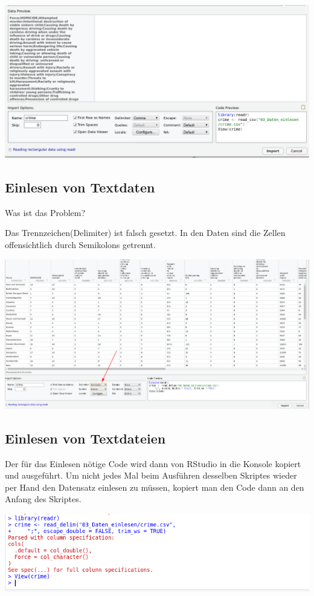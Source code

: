 \documentclass[
]{book}
\begin{document}
\begin{center}\includegraphics[width=0.8\linewidth]{imgs/text} \end{center}

\hypertarget{einlesen-von-textdaten-1}{%
\subsection{Einlesen von Textdaten}\label{einlesen-von-textdaten-1}}

Was ist das Problem?

Das Trennzeichen(Delimiter) ist falsch gesetzt. In den Daten sind die Zellen offensichtlich durch Semikolons getrennt.

\begin{center}\includegraphics[width=0.8\linewidth]{imgs/text2} \end{center}

\hypertarget{einlesen-von-textdateien}{%
\subsection{Einlesen von Textdateien}\label{einlesen-von-textdateien}}

Der für das Einlesen nötige Code wird dann von RStudio in die Konsole kopiert und ausgeführt.
Um nicht jedes Mal beim Ausführen desselben Skriptes wieder per Hand den Datensatz einlesen zu müssen, kopiert man den Code dann an den Anfang des Skriptes.

\begin{center}\includegraphics[width=0.8\linewidth]{imgs/text3} \end{center}
\end{document}
